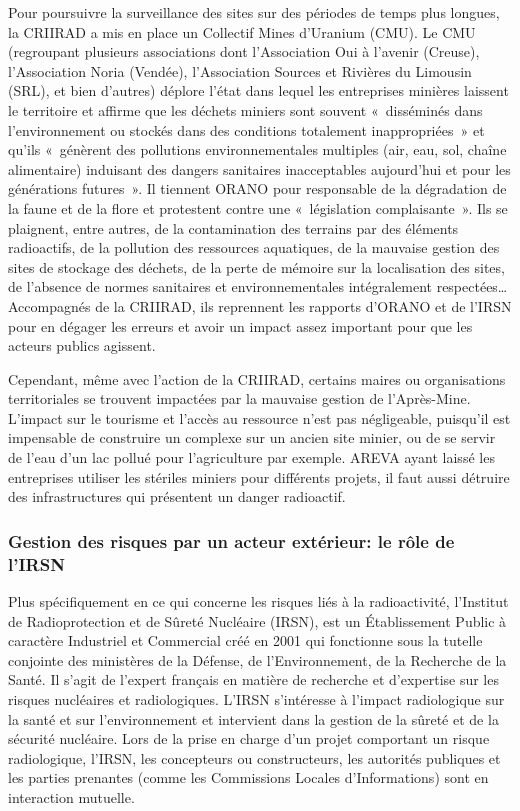\documentclass{article}
\begin{document}
Pour poursuivre la surveillance des sites sur des périodes de temps plus longues, la CRIIRAD a mis en place un Collectif Mines d’Uranium (CMU). Le CMU (regroupant plusieurs associations dont l’Association Oui à l'avenir (Creuse), l’Association Noria (Vendée), l’Association Sources et Rivières du Limousin (SRL), et bien d’autres) déplore  l’état dans lequel les entreprises minières laissent le territoire et  affirme que les déchets miniers sont souvent « disséminés dans l’environnement ou stockés dans des conditions totalement inappropriées » et qu’ils « génèrent des pollutions environnementales multiples (air, eau, sol, chaîne alimentaire) induisant des dangers sanitaires inacceptables aujourd’hui et pour les générations futures ». Il tiennent ORANO pour responsable de la dégradation de la faune et de la flore et protestent contre une « législation complaisante ». Ils se plaignent, entre autres, de la contamination des terrains par des éléments radioactifs, de la pollution des ressources aquatiques, de la mauvaise gestion des sites de stockage des déchets, de la perte de mémoire sur la localisation des sites, de l’absence de normes sanitaires et environnementales intégralement respectées… Accompagnés de la CRIIRAD, ils reprennent les rapports d’ORANO et de l’IRSN pour en dégager les erreurs et avoir un impact assez important pour que les acteurs publics agissent.

Cependant, même avec l’action de la CRIIRAD, certains maires ou organisations territoriales se trouvent impactées par la mauvaise gestion de l’Après-Mine. L’impact sur le tourisme et l’accès au ressource n’est pas négligeable, puisqu’il est impensable de construire un complexe sur un ancien site minier, ou de se servir de l’eau d’un lac pollué pour l’agriculture par exemple. AREVA ayant laissé les entreprises utiliser les stériles miniers pour différents projets, il faut aussi détruire des infrastructures qui présentent un danger radioactif.


\subsubsection{Gestion des risques par un acteur extérieur: le rôle de l’IRSN}
Plus spécifiquement en ce qui concerne les risques liés à la radioactivité, l'Institut de Radioprotection et de Sûreté Nucléaire (IRSN), est un Établissement Public à caractère Industriel et Commercial créé en 2001 qui fonctionne sous la tutelle conjointe des ministères de la Défense, de l’Environnement, de la Recherche de la Santé. Il s’agit de l’expert français en matière de recherche et d’expertise sur les risques nucléaires et radiologiques. L’IRSN s’intéresse à l’impact radiologique sur la santé et sur l'environnement et intervient dans la gestion de la sûreté et de la sécurité nucléaire. Lors de la prise en charge d’un projet comportant un risque radiologique, l’IRSN, les concepteurs ou constructeurs, les autorités publiques et les parties prenantes (comme les Commissions Locales d’Informations) sont en interaction mutuelle.
\end{document}
